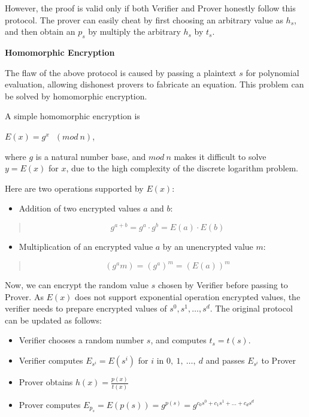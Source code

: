 \documentclass[
]{report}
\providecommand{\tightlist}{%
  \setlength{\itemsep}{0pt}\setlength{\parskip}{0pt}}
\begin{document}
However, the proof is valid only if both Verifier and Prover honestly
follow this protocol. The prover can easily cheat by first choosing an
arbitrary value as \(h_{s}\), and then obtain an \(p_{s}\) by multiply
the arbitrary \(h_{s}\) by \(t_{s}\).

\textbf{Homomorphic Encryption}

The flaw of the above protocol is caused by passing a plaintext \(s\)
for polynomial evaluation, allowing dishonest provers to fabricate an
equation. This problem can be solved by homomorphic encryption.

A simple homomorphic encryption is

\(E(x) = g^{x}\ \ \ (mod\ n)\),

where \(g\) is a natural number base, and \(mod\ n\) makes it difficult
to solve \(y = E(x)\) for \(x\), due to the high complexity of the
discrete logarithm problem.

Here are two operations supported by \(E(x)\):

\begin{itemize}
\tightlist
\item
  Addition of two encrypted values \(a\) and \(b\):
\end{itemize}

\begin{quote}
\[g^{a + b} = g^{a} \cdot g^{b} = E(a) \cdot E(b)\]
\end{quote}

\begin{itemize}
\tightlist
\item
  Multiplication of an encrypted value \(a\) by an unencrypted value
  \(m\):
\end{itemize}

\begin{quote}
\[\left( g^{a}m \right) = \left( g^{a} \right)^{m} = \left( E(a) \right)^{m}\]
\end{quote}

Now, we can encrypt the random value \(s\) chosen by Verifier before
passing to Prover. As \(E(x)\) does not support exponential operation
encrypted values, the verifier needs to prepare encrypted values of
\(s^{0},s^{1},\ldots,s^{d}\). The original protocol can be updated as
follows:

\begin{itemize}
\item
  Verifier chooses a random number \(s\), and computes \(t_{s} = t(s)\).
\item
  Verifier computes \(E_{s^{i}} = E\left( s^{i} \right)\) for \(i\) in
  \(0,\ 1,\ \ldots,\ d\) and passes \(E_{s^{i}}\) to Prover
\item
  Prover obtains \(h(x) = \frac{p(x)}{t(x)}\)
\item
  Prover computes
  \(E_{p_{s}} = E\left( p(s) \right) = g^{p(s)} = g^{c_{0}s^{0} + c_{1}s^{1} + \ldots + c_{d}s^{d}}\)
\end{itemize}
\end{document}
